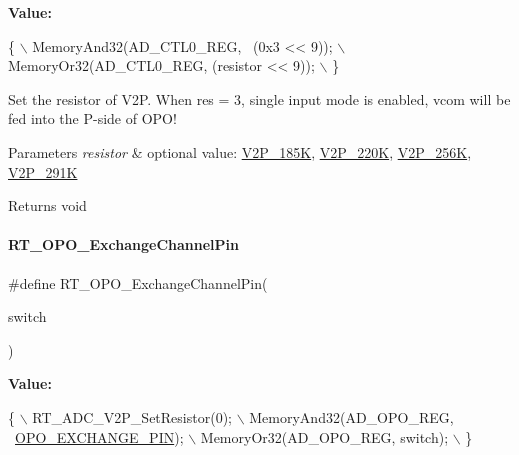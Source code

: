 {\bfseries Value\+:}
\begin{DoxyCode}
\{                                          \(\backslash\)
        MemoryAnd32(AD\_CTL0\_REG, ~(0x3 << 9)); \(\backslash\)
        MemoryOr32(AD\_CTL0\_REG, (resistor << 9));   \(\backslash\)
    \}
\end{DoxyCode}


Set the resistor of V2P. When res = 3, single input mode is enabled, vcom will be fed into the P-\/side of O\+P\+O! 


\begin{DoxyParams}{Parameters}
{\em resistor} & optional value\+: \mbox{\hyperlink{a00002_a80255c41c3764feff9b79664f15feb46aa035ba8725fe8565c5505a295c22ea8e}{V2\+P\+\_\+185K}}, \mbox{\hyperlink{a00002_a80255c41c3764feff9b79664f15feb46a1ac9774056594cac22ae2c6431fa4277}{V2\+P\+\_\+220K}}, \mbox{\hyperlink{a00002_a80255c41c3764feff9b79664f15feb46a4b7eb698a06cc149cbb1b7f8f4dd4a8e}{V2\+P\+\_\+256K}}, \mbox{\hyperlink{a00002_a80255c41c3764feff9b79664f15feb46ae20e5b8adb1fa31fa8df9a56d05e7eb5}{V2\+P\+\_\+291K}} \\
\hline
\end{DoxyParams}
\begin{DoxyReturn}{Returns}
void 
\end{DoxyReturn}
\mbox{\label{a00002_a1846f829df60ca42a455a1688eee7310}} 
\paragraph{\texorpdfstring{R\+T\+\_\+\+O\+P\+O\+\_\+\+Exchange\+Channel\+Pin}{RT\_OPO\_ExchangeChannelPin}}
{\footnotesize\ttfamily \#define R\+T\+\_\+\+O\+P\+O\+\_\+\+Exchange\+Channel\+Pin(\begin{DoxyParamCaption}\item[{}]{switch }\end{DoxyParamCaption})}

{\bfseries Value\+:}
\begin{DoxyCode}
\{                                                   \(\backslash\)
        RT\_ADC\_V2P\_SetResistor(0);                      \(\backslash\)
        MemoryAnd32(AD\_OPO\_REG, ~\mbox{\hyperlink{a00002_af0663f5e9fee7a904ad95d1a4ecdaebda8866b250a87989e76add11875358e4ae}{OPO\_EXCHANGE\_PIN}});     \(\backslash\)
        MemoryOr32(AD\_OPO\_REG, \textcolor{keywordflow}{switch});                 \(\backslash\)
    \}
\end{DoxyCode}


